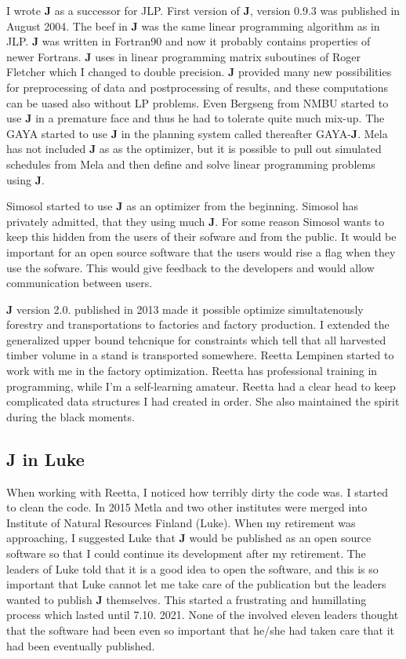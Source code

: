 I wrote \textbf{J} as a successor for JLP. First version of \textbf{J},
version 0.9.3 was published in August 2004. The beef in \textbf{J} was the same linear programming
algorithm as in JLP. \textbf{J} was written in Fortran90 and now
it probably contains properties
of newer Fortrans. \textbf{J} uses in linear programming matrix
suboutines of Roger Fletcher which I changed to double precision. \textbf{J} provided many new possibilities
for preprocessing of data and postprocessing of results, and these computations
can be uased  also without LP problems.
Even Bergseng from NMBU
started to use \textbf{J} in a premature face and thus he had to tolerate quite much mix-up. The GAYA
started to use \textbf{J} in the planning system called thereafter GAYA-\textbf{J}. Mela has not
included \textbf{J} as
as the optimizer, but it is possible to pull out simulated schedules from Mela and then
define and solve linear programming problems using \textbf{J}.

Simosol started to use \textbf{J} as an
optimizer from the beginning. Simosol has privately admitted,
that they using much \textbf{J}.
For some reason Simosol
wants to keep this hidden from the users of their sofware and from the public.
It would be important for an open source software that
the users would rise a flag when they use the sofware.
This would give feedback to the developers
and would allow communication between users.

\textbf{J} version 2.0. published in 2013 made it possible optimize simultatenously
forestry and transportations to factories
and factory production. I extended the generalized upper bound tehcnique
for constraints which tell that
all harvested timber volume in a stand is transported somewhere.
Reetta Lempinen started to work with me in the factory optimization.
Reetta has professional
training in programming, while I'm a self-learning amateur.
Reetta had a clear head to keep complicated data structures I had created in order.
She also maintained the spirit during the black moments.



\subsection*{J in Luke}

When working with Reetta, I noticed how terribly dirty the code was. I started to clean the
code.
In 2015 Metla and
two other institutes were merged into Institute of Natural Resources Finland (Luke).
When my retirement was approaching, I suggested Luke that \textbf{J} would be published as
an open source software so that I could continue its development after my retirement.
The leaders of Luke told that it is a good idea to open the software, and this is so important that
Luke cannot let me take care of the publication but the leaders wanted to publish \textbf{J}
themselves. This started a frustrating and humillating process which lasted until 7.10. 2021. None
of the involved eleven leaders thought that the software had been even so
important that he/she had taken care that it had been eventually published.


